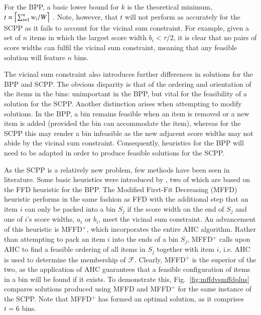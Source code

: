 \documentclass[a4paper,11pt,authoryear]{elsarticle}
\begin{document}
For the BPP, a basic lower bound for $k$ is the theoretical minimum, $t = \ceil*{\sum_{i=1}^{n} w_i / W}$ \citep{martello1990l}. Note, however, that $t$ will not perform as accurately for the SCPP as it fails to account for the vicinal sum constraint. For example, given a set of $n$ items in which the largest score width $b_i < \tau / 2$, it is clear that no pairs of score widths can fulfil the vicinal sum constraint, meaning that any feasible solution will feature $n$ bins.

The vicinal sum constraint also introduces further differences in solutions for the BPP and SCPP. The obvious disparity is that of the ordering and orientation of the items in the bins: unimportant in the BPP, but vital for the feasibility of a solution for the SCPP. Another distinction arises when attempting to modify solutions. In the BPP, a bin remains feasible when an item is removed or a new item is added (provided the bin can accommodate the item), whereas for the SCPP this may render a bin infeasible as the new adjacent score widths may not abide by the vicinal sum constraint. Consequently, heuristics for the BPP will need to be adapted in order to produce feasible solutions for the SCPP.

As the SCPP is a relatively new problem, few methods have been seen in literature. Some basic heuristics were introduced by \cite{hawa2018}, two of which are based on the FFD heuristic for the BPP. The Modified First-Fit Decreasing (MFFD) heuristic performs in the same fashion as FFD with the additional step that an item $i$ can only be packed into a bin $S_j$ if the score width on the end of $S_j$ and one of $i$'s score widths, $a_i$ or $b_i$, meet the vicinal sum constraint. An advancement of this heuristic is MFFD$^+$, which incorporates the entire AHC algorithm. Rather than attempting to pack an item $i$ into the ends of a bin $S_j$, MFFD$^+$ calls upon AHC to find a feasible ordering of all items in $S_j$ together with item $i$, i.e. AHC is used to determine the membership of $\mathcal{F}$. Clearly, MFFD$^+$ is the superior of the two, as the application of AHC guarantees that a feasible configuration of items in a bin will be found if it exists. To demonstrate this, Fig.~\ref{fig:mffdvsmffdplus} compares solutions produced using MFFD and MFFD$^+$ for the same instance of the SCPP. Note that MFFD$^+$ has formed an optimal solution, as it comprises $t = 6$ bins.
\end{document}
